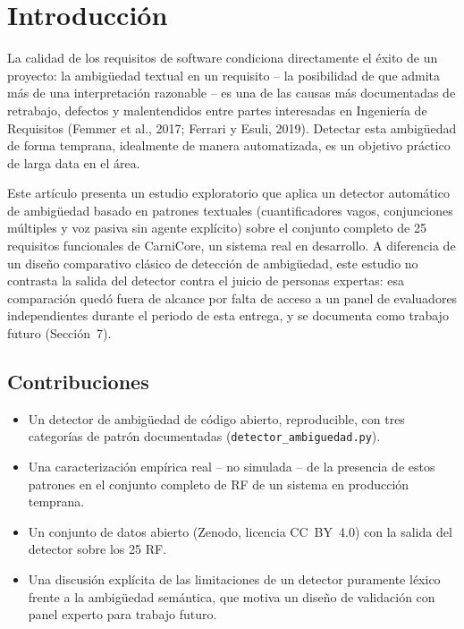 \documentclass[11pt,a4paper]{article}
\begin{document}
\section{Introducci\'on}

La calidad de los requisitos de software condiciona directamente el \'exito de un proyecto: la ambig\"uedad textual en un requisito -- la posibilidad de que admita m\'as de una interpretaci\'on razonable -- es una de las causas m\'as documentadas de retrabajo, defectos y malentendidos entre partes interesadas en Ingenier\'ia de Requisitos (Femmer et al., 2017; Ferrari y Esuli, 2019). Detectar esta ambig\"uedad de forma temprana, idealmente de manera automatizada, es un objetivo pr\'actico de larga data en el \'area.

Este art\'iculo presenta un estudio exploratorio que aplica un detector autom\'atico de ambig\"uedad basado en patrones textuales (cuantificadores vagos, conjunciones m\'ultiples y voz pasiva sin agente expl\'icito) sobre el conjunto completo de 25 requisitos funcionales de CarniCore, un sistema real en desarrollo. A diferencia de un dise\~no comparativo cl\'asico de detecci\'on de ambig\"uedad, este estudio no contrasta la salida del detector contra el juicio de personas expertas: esa comparaci\'on qued\'o fuera de alcance por falta de acceso a un panel de evaluadores independientes durante el periodo de esta entrega, y se documenta como trabajo futuro (Secci\'on~7).

\subsection*{Contribuciones}
\begin{itemize}[leftmargin=*]
\item Un detector de ambig\"uedad de c\'odigo abierto, reproducible, con tres categor\'ias de patr\'on documentadas (\texttt{detector\_ambiguedad.py}).
\item Una caracterizaci\'on emp\'irica real -- no simulada -- de la presencia de estos patrones en el conjunto completo de RF de un sistema en producci\'on temprana.
\item Un conjunto de datos abierto (Zenodo, licencia CC~BY~4.0) con la salida del detector sobre los 25 RF.
\item Una discusi\'on expl\'icita de las limitaciones de un detector puramente l\'exico frente a la ambig\"uedad sem\'antica, que motiva un dise\~no de validaci\'on con panel experto para trabajo futuro.
\end{itemize}
\end{document}
